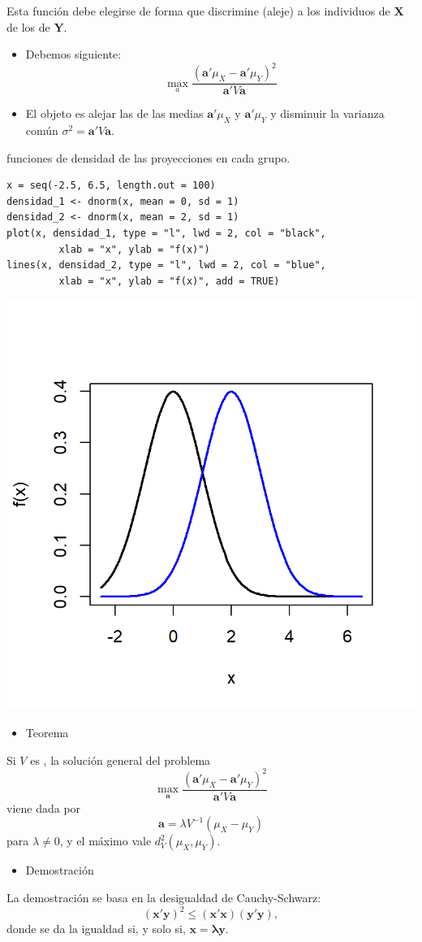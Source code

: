 Esta función debe elegirse de forma que discrimine (aleje) a los individuos de $\mathbf{X}$ de los de $\mathbf{Y}$.
\begin{itemize}
	\item Debemos  siguiente: \[ \max_a\dfrac{(\mathbf{a'}\mu_X-\mathbf{a'}\mu_Y)^2}{\mathbf{a'}V\mathbf{a}} \]
	\item El objeto es alejar las  de las medias $ \mathbf{a'}\mu_X$ y $\mathbf{a'}\mu_Y$ y disminuir la varianza común $\sigma^2=\mathbf{a'}V\mathbf{a}$.
\end{itemize}
 funciones de densidad de las proyecciones en cada grupo.
\begin{lstlisting}
x = seq(-2.5, 6.5, length.out = 100)
densidad_1 <- dnorm(x, mean = 0, sd = 1)
densidad_2 <- dnorm(x, mean = 2, sd = 1)
plot(x, densidad_1, type = "l", lwd = 2, col = "black", 
		 xlab = "x", ylab = "f(x)")
lines(x, densidad_2, type = "l", lwd = 2, col = "blue", 
		 xlab = "x", ylab = "f(x)", add = TRUE)
\end{lstlisting}
\begin{center}
	\includegraphics[width=0.5\linewidth]{"Temas/Imágenes/Tema 5/screenshot002"}
\end{center}
\begin{itemize}[label=\color{red}\textbullet, leftmargin=*]
	\item \color{lightblue}Teorema
\end{itemize}
Si $V$ es , la solución general del problema \[ \max_{\mathbf{a}}\dfrac{(\mathbf{a'}\mu_X-\mathbf{a'}\mu_Y)^2}{\mathbf{a'}V\mathbf{a}} \]viene dada por \[ \mathbf{a}=\lambda V^{-1}(\mu_X-\mu_Y) \]para $\lambda\neq0$, y el máximo vale $d_V^2(\mu_X,\mu_Y)$.
\begin{itemize}[label=\color{red}\textbullet, leftmargin=*]
	\item \color{lightblue}Demostración
\end{itemize}
La demostración se basa en la desigualdad de Cauchy-Schwarz: \[ (\mathbf{x'y})^2\le(\mathbf{x'x})(\mathbf{y'y}), \]donde se da la igualdad si, y solo si, $\mathbf{x=\lambda y}$.

